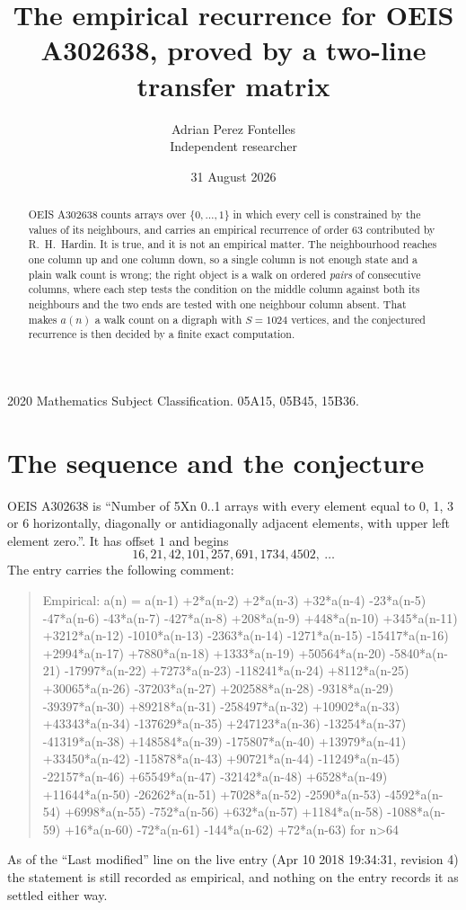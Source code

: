 \documentclass[11pt,a4paper]{article}
\title{The empirical recurrence for OEIS A302638, proved by a two-line transfer matrix}
\author{Adrian Perez Fontelles\\ \small Independent researcher}
\date{31 August 2026}
\theoremstyle{plain}
\theoremstyle{definition}
\begin{document}
\maketitle

\begin{abstract}
OEIS A302638 counts arrays over $\{0,\dots,1\}$ in which every cell is constrained by the
values of its neighbours, and carries an empirical recurrence of order $63$ contributed
by R.~H.~Hardin. It is true, and it is not an empirical matter. The neighbourhood reaches one
column up and one column down, so a single column is not enough state and a plain walk count
is wrong; the right object is a walk on ordered \emph{pairs} of consecutive columns, where
each step tests the condition on the middle column against both its neighbours and the two
ends are tested with one neighbour column absent. That makes $a(n)$ a walk count on a digraph
with $S=1024$ vertices, and the conjectured recurrence is then decided by a finite exact
computation.
\end{abstract}

\noindent\small 2020 Mathematics Subject Classification. 05A15, 05B45, 15B36.\normalsize

\section{The sequence and the conjecture}

OEIS A302638 is ``Number of 5Xn 0..1 arrays with every element equal to 0, 1, 3 or 6 horizontally, diagonally or antidiagonally adjacent elements, with upper left element zero.''. It has offset $1$ and begins
\[
16, 21, 42, 101, 257, 691, 1734, 4502,\ \dots
\]
The entry carries the following comment:
\begin{quote}\small
Empirical: a(n) = a(n-1) +2*a(n-2) +2*a(n-3) +32*a(n-4) -23*a(n-5) -47*a(n-6) -43*a(n-7) -427*a(n-8) +208*a(n-9) +448*a(n-10) +345*a(n-11) +3212*a(n-12) -1010*a(n-13) -2363*a(n-14) -1271*a(n-15) -15417*a(n-16) +2994*a(n-17) +7880*a(n-18) +1333*a(n-19) +50564*a(n-20) -5840*a(n-21) -17997*a(n-22) +7273*a(n-23) -118241*a(n-24) +8112*a(n-25) +30065*a(n-26) -37203*a(n-27) +202588*a(n-28) -9318*a(n-29) -39397*a(n-30) +89218*a(n-31) -258497*a(n-32) +10902*a(n-33) +43343*a(n-34) -137629*a(n-35) +247123*a(n-36) -13254*a(n-37) -41319*a(n-38) +148584*a(n-39) -175807*a(n-40) +13979*a(n-41) +33450*a(n-42) -115878*a(n-43) +90721*a(n-44) -11249*a(n-45) -22157*a(n-46) +65549*a(n-47) -32142*a(n-48) +6528*a(n-49) +11644*a(n-50) -26262*a(n-51) +7028*a(n-52) -2590*a(n-53) -4592*a(n-54) +6998*a(n-55) -752*a(n-56) +632*a(n-57) +1184*a(n-58) -1088*a(n-59) +16*a(n-60) -72*a(n-61) -144*a(n-62) +72*a(n-63) for n>64
\end{quote}
As of the ``Last modified'' line on the live entry (Apr 10 2018 19:34:31, revision 4) the statement is
still recorded as empirical, and nothing on the entry records it as settled either way.
\end{document}
